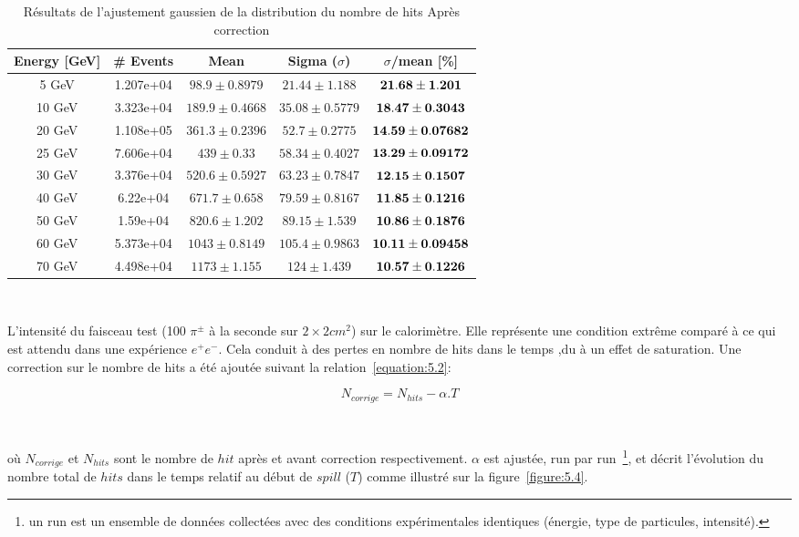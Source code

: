 \begin{table}[H]
  \begin{center}
    \begin{tabular}{|c|c|c|c|c|} \hline
      Energy [GeV] & \# Events & Mean & Sigma ($\sigma$) & $\sigma$/mean [\%] \\ \hline
      5 GeV &1.207e+04 & $98.9\pm0.8979$&$21.44\pm1.188$ & $ \bf21.68\pm1.201$ \\ \hline
      10 GeV &3.323e+04 & $189.9\pm0.4668$&$35.08\pm0.5779$ & $ \bf18.47\pm0.3043$ \\ \hline
      20 GeV &1.108e+05 & $361.3\pm0.2396$&$52.7\pm0.2775$ & $ \bf14.59\pm0.07682$ \\ \hline
      25 GeV &7.606e+04 & $439\pm0.33$&$58.34\pm0.4027$ & $ \bf13.29\pm0.09172$ \\ \hline
      30 GeV &3.376e+04 & $520.6\pm0.5927$&$63.23\pm0.7847$ & $ \bf12.15\pm0.1507$ \\ \hline
      40 GeV &6.22e+04 & $671.7\pm0.658$&$79.59\pm0.8167$ & $ \bf11.85\pm0.1216$ \\ \hline
      50 GeV &1.59e+04 & $820.6\pm1.202$&$89.15\pm1.539$ & $ \bf10.86\pm0.1876$ \\ \hline
      60 GeV &5.373e+04 & $1043\pm0.8149$&$105.4\pm0.9863$ & $ \bf10.11\pm0.09458$ \\ \hline
      70 GeV &4.498e+04 & $1173\pm1.155$&$124\pm1.439$ & $ \bf10.57\pm0.1226$ \\ \hline
    \end{tabular}
    \caption{Résultats de l'ajustement gaussien de la distribution du nombre de hits Après correction}
    \label{tab:5.2}
  \end{center} 
\end{table}

~\par L'intensit\'e du faisceau test (100 $\pi^{\pm}$ \`a la seconde sur $2{\times}2 cm^2$) sur le calorim\`etre. Elle représente une condition extrême comparé à ce qui est attendu dans une expérience $e^+e^-$. Cela conduit \`a des pertes en nombre de hits dans le temps ,du à un effet de saturation. Une correction sur le nombre de hits a été ajoutée suivant la relation~\eqref{equation:5.2}:

\begin{equation}
  N_{corrige}=N_{hits}-\alpha.T 
\label{equation:5.2}
\end{equation}

~\par o\`u $N_{corrige}$ et $N_{hits}$ sont le nombre de $hit$ apr\`es et avant correction respectivement. $\alpha$ est ajust\'ee, run par run~\footnote{un run est un ensemble de données collectées avec des conditions expérimentales identiques (énergie, type de particules, intensité).}, et d\'ecrit l'\'evolution du nombre total de $hits$ dans le temps relatif au d\'ebut de $spill$ ($T$) comme illustr\'e sur la figure~\ref{figure:5.4}.  


